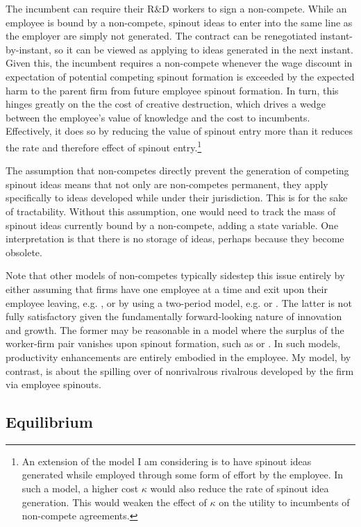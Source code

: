 \documentclass[12pt,english]{article}
\theoremstyle{remark}
\begin{document}
The incumbent can require their R\&D workers to sign a non-compete. While an employee is bound by a non-compete, spinout ideas to enter into the same line as the employer are simply not generated. The contract can be renegotiated instant-by-instant, so it can be viewed as applying to ideas generated in the next instant. Given this, the incumbent requires a non-compete whenever the wage discount in expectation of potential competing spinout formation is exceeded by the expected harm to the parent firm from future employee spinout formation. In turn, this hinges greatly on the the cost of creative destruction, which drives a wedge between the employee's value of knowledge and the cost to incumbents. Effectively, it does so by reducing the value of spinout entry more than it reduces the rate and therefore effect of spinout entry.\footnote{An extension of the model I am considering is to have spinout ideas generated whsile employed through some form of effort by the employee. In such a model, a higher cost $\kappa$ would also reduce the rate of spinout idea generation. This would weaken the effect of $\kappa$ on the utility to incumbents of non-compete agreements.}

The assumption that non-competes directly prevent the generation of competing spinout ideas means that not only are non-competes permanent, they apply specifically to ideas developed while under their jurisdiction. This is for the sake of tractability. Without this assumption, one would need to track the mass of spinout ideas currently bound by a non-compete, adding a state variable. One interpretation is that there is no storage of ideas, perhaps because they become obsolete. 

Note that other models of non-competes typically sidestep this issue entirely by either assuming that firms have one employee at a time and exit upon their employee leaving, e.g. \cite{shi_restrictions_2018}, or by using a two-period model, e.g. \cite{franco_spin-outs:_2006} or \cite{franco_covenants_2008}. The latter is not fully satisfactory given the fundamentally forward-looking nature of innovation and growth. The former may be reasonable in a model where the surplus of the worker-firm pair vanishes upon spinout formation, such as \cite{shi_restrictions_2018} or \cite{baslandze_spinout_2019}. In such models, productivity enhancements are entirely embodied in the employee. My model, by contrast, is about the spilling over of nonrivalrous rivalrous developed by the firm via employee spinouts. 

\subsection{Equilibrium}
\end{document}
